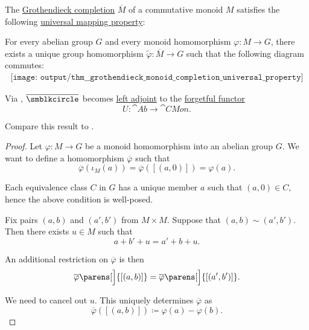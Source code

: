 \begin{theorem}\label{thm:grothendieck_monoid_completion_universal_property}
  The \hyperref[def:monoid_grothendieck_completion]{Grothendieck completion} \( \overline{M} \) of a commutative monoid \( M \) satisfies the following \hyperref[rem:universal_mapping_property]{universal mapping property}:
  \begin{displayquote}
    For every abelian group \( G \) and every monoid homomorphism \( \varphi: M \to G \), there exists a unique group homomorphism \( \widetilde{\varphi}: \overline{M} \to G \) such that the following diagram commutes:
    \begin{equation}\label{eq:thm:grothendieck_monoid_completion_universal_property/diagram}
      \begin{aligned}
        \texttt{[image: output/thm\_\_grothendieck\_monoid\_completion\_universal\_property]}
      \end{aligned}
    \end{equation}
  \end{displayquote}

  Via , \( \overline{\anon} \) becomes \hyperref[def:category_adjunction]{left adjoint} to the \hyperref[def:concrete_category]{forgetful functor}
  \begin{equation*}
    U: \cat{Ab} \to \cat{CMon}.
  \end{equation*}

  Compare this result to .
\end{theorem}
\begin{proof}
  Let \( \varphi: M \to G \) be a monoid homomorphism into an abelian group \( G \). We want to define a homomorphism \( \overline{\varphi} \) such that
  \begin{equation*}
    \overline{\varphi}(\iota_M(a)) = \overline{\varphi}([(a, 0)]) = \varphi(a).
  \end{equation*}

  Each equivalence class \( C \) in \( G \) has a unique member \( a \) such that \( (a, 0) \in C \), hence the above condition is well-posed.

  Fix pairs \( (a, b) \) and \( (a', b') \) from \( M \times M \). Suppose that \( (a, b) \sim (a', b') \). Then there exists \( u \in M \) such that
  \begin{equation*}
    a + b' + u = a' + b + u.
  \end{equation*}

  An additional restriction on \( \overline{\varphi} \) is then
  \begin{equation*}
    \overline{\varphi}\parens[\Big]{ [(a, b)] }
    =
    \overline{\varphi}\parens[\Big]{ [(a', b')] }.
  \end{equation*}

  We need to cancel out \( u \). This uniquely determines \( \overline{\varphi} \) as
  \begin{equation*}
    \overline{\varphi}([(a, b)]) \coloneqq \varphi(a) - \varphi(b).
  \end{equation*}
\end{proof}

